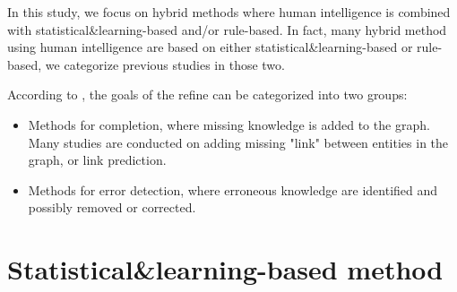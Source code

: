 \documentclass{article}
\begin{document}
In this study, we focus on hybrid methods where human intelligence is combined with statistical\&learning-based and/or rule-based.  In fact, many hybrid method using human intelligence are based on either statistical\&learning-based or rule-based, we categorize previous studies in those two.

According to \cite{paulheim_knowledge_2017}, the goals of the refine can be categorized into two groups: 

\begin{itemize}
    \item Methods for completion, where missing knowledge is added to the graph. 
    Many studies are conducted on adding missing "link" between entities in the graph, 
    or link prediction. 
    \item Methods for error detection, where erroneous knowledge are identified
    and possibly removed or corrected.
\end{itemize}

\section{Statistical\&learning-based method}




\end{document}
